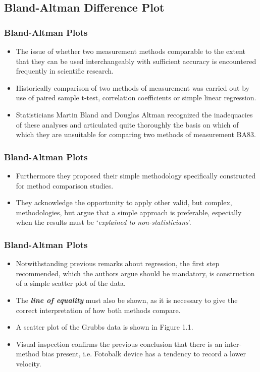\documentclass[compress]{beamer}        %
\begin{document}
\subsection{Bland-Altman Difference Plot}
\begin{frame}
\frametitle{Bland-Altman Plots}
\large
\begin{itemize}
\item 
The issue of whether two measurement methods comparable to the
extent that they can be used interchangeably with sufficient
accuracy is encountered frequently in scientific research.
\item Historically comparison of two methods of measurement was carried
out by use of paired sample t-test, correlation coefficients or
simple linear regression.
\item  Statisticians Martin Bland and Douglas
Altman recognized the inadequacies of these analyses and
articulated quite thoroughly the basis on which of which they are
unsuitable for comparing two methods of measurement \alert{BA83}.

\end{itemize}
\end{frame}
\begin{frame}
\frametitle{Bland-Altman Plots}
\large
\begin{itemize}
\item 
Furthermore they proposed their simple methodology specifically
constructed for method comparison studies. 
\item They acknowledge the
opportunity to apply other valid, but complex, methodologies, but
argue that a simple approach is preferable, especially when the
results must be `\textit{explained to non-statisticians}'.
\end{itemize}
\end{frame}
\begin{frame}
\frametitle{Bland-Altman Plots}
\large
\begin{itemize}
\item Notwithstanding previous remarks about regression, the first step
recommended, which the authors argue should be mandatory, is
construction of a simple scatter plot of the data. 
\item The \textbf{\textit{line of
equality}} must also be shown, as it is necessary to give the
correct interpretation of how both methods compare. 
\item A scatter plot
of the Grubbs data is shown in Figure 1.1. 
\item Visual inspection confirms the previous conclusion that there is an
inter-method bias present, i.e. Fotobalk device has a tendency to
record a lower velocity.
\end{itemize}
\end{frame}
\end{document}
